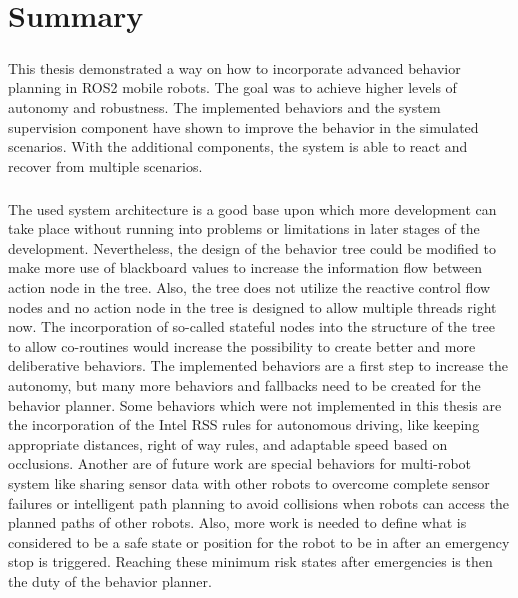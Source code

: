 \chapter{Summary}
\label{cha:diskussion}
\paragraph*{}

This thesis demonstrated a way on how to incorporate advanced behavior planning in ROS2 mobile robots. The goal was to achieve higher levels of autonomy and robustness. The implemented behaviors and the system supervision component have shown to improve the behavior in the simulated scenarios. With the additional components, the system is able to react and recover from multiple scenarios. 
\paragraph*{}

The used system architecture is a good base upon which more development can take place without running into problems or limitations in later stages of the development. Nevertheless, the design of the behavior tree could be modified to make more use of blackboard values to increase the information flow between action node in the tree. Also, the tree does not utilize the reactive control flow nodes and no action node in the tree is designed to allow multiple threads right now. The incorporation of so-called stateful nodes into the structure of the tree to allow co-routines would increase the possibility to create better and more deliberative behaviors. 
The implemented behaviors are a first step to increase the autonomy, but many more behaviors and fallbacks need to be created for the behavior planner. Some behaviors which were not implemented in this thesis are the incorporation of the Intel RSS rules for autonomous driving, like keeping appropriate distances, right of way rules, and adaptable speed based on occlusions.
Another are of future work are special behaviors for multi-robot system like sharing sensor data with other robots to overcome complete sensor failures or intelligent path planning to avoid collisions when robots can access the planned paths of other robots. 
Also, more work is needed to define what is considered to be a safe state or position for the robot to be in after an emergency stop is triggered. Reaching these minimum risk states after emergencies is then the duty of the behavior planner. 

